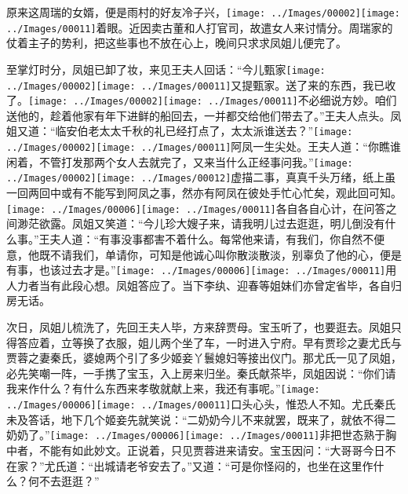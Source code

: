 原来这周瑞的女婿，便是雨村的好友冷子兴，{\texttt{[image: ../Images/00002]}\texttt{[image: ../Images/00011]}\footnotesize \kaishu 着眼。}近因卖古董和人打官司，故遣女人来讨情分。周瑞家的仗着主子的势利，把这些事也不放在心上，晚间只求求凤姐儿便完了。

至掌灯时分，凤姐已卸了妆，来见王夫人回话：``今儿甄家{\texttt{[image: ../Images/00002]}\texttt{[image: ../Images/00011]}\footnotesize \kaishu 又提甄家。}送了来的东西，我已收了。{\texttt{[image: ../Images/00002]}\texttt{[image: ../Images/00011]}\footnotesize \kaishu 不必细说方妙。}咱们送他的，趁着他家有年下进鲜的船回去，一并都交给他们带去了。''王夫人点头。凤姐又道：``临安伯老太太千秋的礼已经打点了，太太派谁送去？''{{\texttt{[image: ../Images/00002]}\texttt{[image: ../Images/00011]}\footnotesize \kaishu 阿凤一生尖处。}}王夫人道：``你瞧谁闲着，不管打发那两个女人去就完了，又来当什么正经事问我。''{{\texttt{[image: ../Images/00002]}\texttt{[image: ../Images/00012]}\footnotesize \kaishu 虚描二事，真真千头万绪，纸上虽一回两回中或有不能写到阿凤之事，然亦有阿凤在彼处手忙心忙矣，观此回可知。　}\texttt{[image: ../Images/00006]}\texttt{[image: ../Images/00011]}\footnotesize \kaishu 各自各自心计，在问答之间渺茫欲露。}凤姐又笑道：``今儿珍大嫂子来，请我明儿过去逛逛，明儿倒没有什么事。''王夫人道：``有事没事都害不着什么。每常他来请，有我们，你自然不便意，他既不请我们，单请你，可知是他诚心叫你散淡散淡，别辜负了他的心，便是有事，也该过去才是。''{\texttt{[image: ../Images/00006]}\texttt{[image: ../Images/00011]}\footnotesize \kaishu 用人力者当有此段心想。}凤姐答应了。当下李纨、迎春等姐妹们亦曾定省毕，各自归房无话。

次日，凤姐儿梳洗了，先回王夫人毕，方来辞贾母。宝玉听了，也要逛去。凤姐只得答应着，立等换了衣服，姐儿两个坐了车，一时进入宁府。早有贾珍之妻尤氏与贾蓉之妻秦氏，婆媳两个引了多少姬妾丫鬟媳妇等接出仪门。那尤氏一见了凤姐，必先笑嘲一阵，一手携了宝玉，入上房来归坐。秦氏献茶毕，凤姐因说：``你们请我来作什么？有什么东西来孝敬就献上来，我还有事呢。''{\texttt{[image: ../Images/00006]}\texttt{[image: ../Images/00011]}\footnotesize \kaishu 口头心头，惟恐人不知。}尤氏秦氏未及答话，地下几个姬妾先就笑说：``二奶奶今儿不来就罢，既来了，就依不得二奶奶了。''{\texttt{[image: ../Images/00006]}\texttt{[image: ../Images/00011]}\footnotesize \kaishu 非把世态熟于胸中者，不能有如此妙文。}正说着，只见贾蓉进来请安。宝玉因问：``大哥哥今日不在家？''尤氏道：``出城请老爷安去了。''又道：``可是你怪闷的，也坐在这里作什么？何不去逛逛？''

